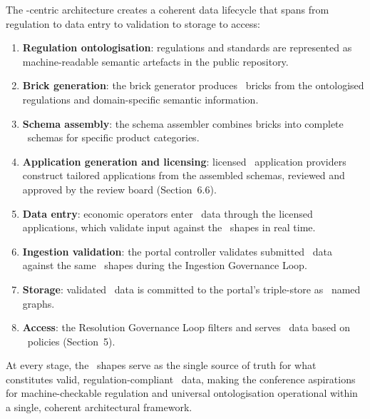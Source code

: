 The \SHACL-centric architecture creates a coherent data lifecycle that spans
from regulation to data entry to validation to storage to access:

\begin{enumerate}
\item \textbf{Regulation ontologisation}: regulations and standards are
represented as machine-readable semantic artefacts in the public repository.
\item \textbf{Brick generation}: the brick generator produces \SHACL\ bricks
from the ontologised regulations and domain-specific semantic information.
\item \textbf{Schema assembly}: the schema assembler combines bricks into
complete \SHACL\ schemas for specific product categories.
\item \textbf{Application generation and licensing}: licensed \DPP\ application
providers construct tailored applications from the assembled schemas, reviewed
and approved by the review board (Section~6.6).
\item \textbf{Data entry}: economic operators enter \DPP\ data through the
licensed applications, which validate input against the \SHACL\ shapes in real
time.
\item \textbf{Ingestion validation}: the portal controller validates submitted
\DPP\ data against the same \SHACL\ shapes during the Ingestion Governance Loop.
\item \textbf{Storage}: validated \DPP\ data is committed to the portal's
triple-store as \RDF\ named graphs.
\item \textbf{Access}: the Resolution Governance Loop filters and serves \DPP\
data based on \ABAC\ policies (Section~5).
\end{enumerate}

At every stage, the \SHACL\ shapes serve as the single source of truth for what
constitutes valid, regulation-compliant \DPP\ data, making the conference
aspirations for machine-checkable regulation and universal ontologisation
operational within a single, coherent architectural framework.
